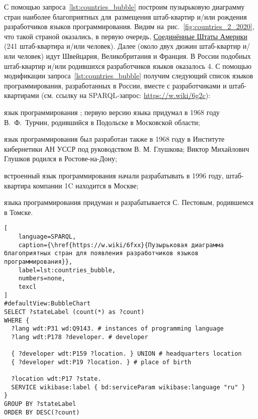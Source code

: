 С помощью запроса~\ref{lst:countries_bubble} 
построим пузырьковую диаграмму стран  
наиболее благоприятных для~размещения штаб-квартир и/или 
рождения разработчиков языков программирования. 
Видим на~рис.~\ref{fig:countries_2_2020}, 
что такой страной оказались, в первую очередь, 
\href{https://en.wikipedia.org/wiki/USA}{Соединённые Штаты Америки} (241 штаб-квартира и/или человек). 
Далее (около двух дюжин штаб-квартир и/или человек) идут 
Швейцария, Великобритания и Франция.  
В России подобных штаб-квартир и/или родившихся разработчиков языков оказалось 4. 
С помощью модификации запроса~\ref{lst:countries_bubble} получим 
следующий список языков программирования, разработанных в России, 
вместе с разработчиками и штаб-квартирами 
(см. ссылку на SPARQL-запрос: \href{https://w.wiki/6g2c}{https://w.wiki/6g2c}):
\begin{compactitemize}
	\item язык программирования ;  
        первую версию языка придумал в 1968 году В.~Ф.~Турчин, 
        родившийся в Подольске в Московской области; 

    \item язык программирования  
        был разработан также в 1968 году в Институте кибернетики АН УССР 
        под руководством В. М. Глушкова; Виктор Михайлович Глушков родился в Ростове-на-Дону;

	\item встроенный язык программирования  начали разрабатывать в 1996 году, 
        штаб-квартира компании 1C находится в Москве; 

    \item языка программирования 
        придуман и разрабатывается С. Пестовым, родившемся в Томске.
\end{compactitemize}



\begin{lstlisting}[
	language=SPARQL,
	caption={\href{https://w.wiki/6fxx}{Пузырьковая диаграмма благоприятных стран для появления разработчиков языков программирования}},
	label=lst:countries_bubble,
    numbers=none,
	texcl
]
#defaultView:BubbleChart
SELECT ?stateLabel (count(*) as ?count)
WHERE {
  ?lang wdt:P31 wd:Q9143. # instances of programming language
  ?lang wdt:P178 ?developer. # developer
  	
  { ?developer wdt:P159 ?location. } UNION # headquarters location
  { ?developer wdt:P19 ?location. } # place of birth
  
  ?location wdt:P17 ?state.
  SERVICE wikibase:label { bd:serviceParam wikibase:language "ru" } 	
}
GROUP BY ?stateLabel
ORDER BY DESC(?count)
\end{lstlisting}







